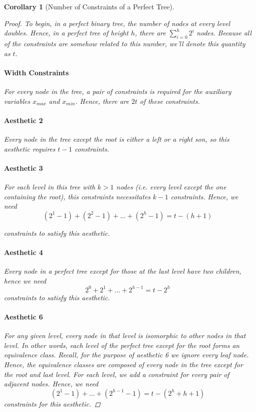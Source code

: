 \documentclass[11pt]{report}
\newtheorem{corollary}{Corollary}[section]
\begin{document}
\begin{corollary}[Number of Constraints of a Perfect Tree]
    
    \begin{proof}
        To begin, in a perfect binary tree, the number of nodes at every level doubles. Hence, in a perfect tree of height $h$, there are 
        $\sum_{i=0}^h 2^i$ nodes. Because all of the constraints are somehow related to this number, we'll denote this quantity as $t$.
        
        \paragraph{Width Constraints} For every node in the tree, a pair of constraints is required for the auxiliary variables $x_{max}$ and $x_{min}$. Hence, there are $2t$ of these constraints.
        
        \paragraph{Aesthetic 2} Every node in the tree except the root is either a left or a right son, so this aesthetic requires $t - 1$ constraints.
        
        \paragraph{Aesthetic 3} For each level in this tree with $k > 1$ nodes (i.e. every level except the one containing the root), this constraints necessitates $k - 1$ constraints. Hence, we need 
        \[
            (2^1 - 1) + (2^2 - 1) + ... + (2^h - 1) = t - (h + 1)
        \]
        
        constraints to satisfy this aesthetic.
        
        \paragraph{Aesthetic 4} Every node in a perfect tree except for those at the last level have two children, hence we need
        \[
            2^0 + 2^1 + ... + 2^{h-1} = t - 2^h
        \]
        constraints to satisfy this aesthetic.
        
        \paragraph{Aesthetic 6} For any given level, every node in that level is isomorphic to other nodes in that level. In other words, each level of the perfect tree except for the root forms an equivalence class. Recall, for the purpose of aesthetic 6 we ignore every leaf node. Hence, the equivalence classes are composed of every node in the tree except for the root and last level. For each level, we add a constraint for every pair of adjacent nodes. Hence, we need
        \[
            (2^1 - 1) + ... + (2^{h - 1} - 1) = t - (2^h + h + 1)
        \]
        constraints for this aesthetic.
    \end{proof}
\end{corollary}
\end{document}
